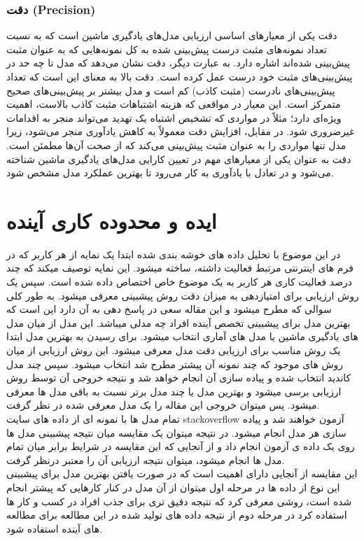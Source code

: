 \subsubsection*{دقت (Precision)}
دقت یکی از معیارهای اساسی ارزیابی مدل‌های یادگیری ماشین است که به نسبت تعداد نمونه‌های مثبت درست پیش‌بینی شده به کل نمونه‌هایی که به عنوان مثبت پیش‌بینی شده‌اند اشاره دارد. به عبارت دیگر، دقت نشان می‌دهد که مدل تا چه حد در پیش‌بینی‌های مثبت خود درست عمل کرده است. دقت بالا به معنای این است که تعداد پیش‌بینی‌های نادرست (مثبت کاذب) کم است و مدل بیشتر بر پیش‌بینی‌های صحیح متمرکز است. این معیار در مواقعی که هزینه اشتباهات مثبت کاذب بالاست، اهمیت ویژه‌ای دارد؛ مثلاً در مواردی که تشخیص اشتباه یک تهدید می‌تواند منجر به اقدامات غیرضروری شود. در مقابل، افزایش دقت معمولاً به کاهش یادآوری منجر می‌شود، زیرا مدل تنها مواردی را به عنوان مثبت پیش‌بینی می‌کند که از صحت آن‌ها مطمئن است. دقت به عنوان یکی از معیارهای مهم در تعیین کارایی مدل‌های یادگیری ماشین شناخته می‌شود و در تعادل با یادآوری به کار می‌رود تا بهترین عملکرد مدل مشخص شود.





\section*{ایده و محدوده کاری آینده}
در این موضوع با تحلیل داده های خوشه بندی شده ابتدا یک نمایه از هر کاربر که در فرم های اینترنتی مرتبط فعالیت داشته، ساخته میشود.
این نمایه توصیف میکند که چند درصد فعالیت کاری هر کاربر به یک موضوع خاص اختصاص داده شده است.
سپس یک روش ارزیابی برای امتیازدهی به میزان دقت روش پیشبینی معرفی میشود.
به طور کلی سوالی که مطرح میشود و این مقاله سعی در پاسخ دهی به آن دارد این است که بهترین مدل برای پیشبینی تخصص آینده افراد چه مدلی میباشد. این مدل از میان مدل های یادگیری ماشین یا مدل های آماری انتخاب میشود. برای رسیدن به بهترین مدل ابتدا یک روش مناسب برای ارزیابی دقت مدل معرفی میشود. این روش ارزیابی از میان روش های موجود که چند نمونه آن پیشتر مطرح شد انتخاب میشود. سپس چند مدل کاندید انتخاب شده و پیاده سازی آن انجام خواهد شد و نتیجه خروجی آن توسط روش ارزیابی برسی میشود و بهترین مدل یا چند مدل برتر نسبت به باقی مدل ها معرفی میشود.
پس میتوان خروجی این مقاله را یک مدل معرفی شده در نظر گرفت.
\\
تمام مدل ها با نمونه ای از داده های سایت stackoverflow  آزمون خواهند شد و پیاده سازی هر مدل انجام میشود.
در نتیجه میتوان یک مقایسه میان نتیجه پیشبینی مدل ها روی یک داده ی آزمون انجام داد و از آنجایی که این مقایسه در شرایط برابر میان تمام مدل ها انجام میشود، میتوان نتیجه ارزیابی آن را معتبر درنظر گرفت.
\\
این مقایسه از آنجایی دارای اهمیت است که در صورت یافتن بهترین مدل برای پیشبینی این نوع از داده ها در مرحله اول میتوان از آن مدل در کنار کارهایی که پیشتر انجام شده است، روشی معرفی کرد که نتیجه دقیق تری برای جذب افراد در کسب و کار ها استفاده کرد در مرحله دوم از نتیجه داده های تولید شده در این مطالعه برای مطالعه های آینده استفاده شود.

